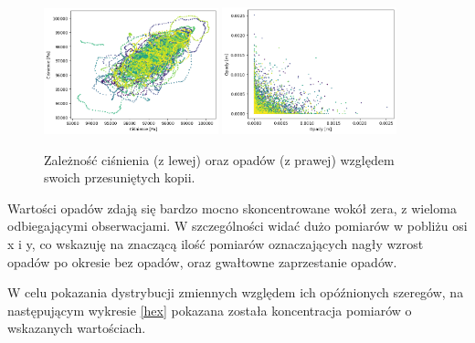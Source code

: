 \begin{figure}[H]
    \centering
    \includegraphics[width=0.45\textwidth]{images/pressure_scatter.png}
    \includegraphics[width=0.45\textwidth]{images/precipitation_scatter.png}
    \caption{Zależność ciśnienia (z lewej) oraz opadów (z prawej) względem 
    swoich przesuniętych kopii.}
    \label{pressure-precipitation}
\end{figure}

Wartości opadów zdają się bardzo mocno skoncentrowane wokół zera, z wieloma 
odbiegającymi obserwacjami. W szczególności widać dużo pomiarów w pobliżu 
osi x i y, co wskazuję na znaczącą ilość pomiarów oznaczających nagły wzrost opadów
po okresie bez opadów, oraz gwałtowne zaprzestanie opadów.

W celu pokazania dystrybucji zmiennych względem ich opóźnionych szeregów, na następującym 
wykresie \ref{hex} pokazana została koncentracja pomiarów o wskazanych wartościach.

